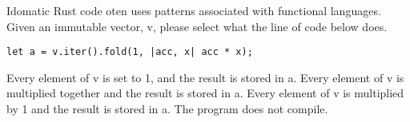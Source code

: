 %
%
Idomatic Rust code oten uses patterns associated with functional languages. Given an immutable vector, v, please select what the line of code below does.
\begin{lstlisting}
let a = v.iter().fold(1, |acc, x| acc * x);
\end{lstlisting}
  \choice Every element of v is set to 1, and the result is stored in a.
  \choice Every element of v is multiplied together and the result is stored in a.
  \choice Every element of v is multiplied by 1 and the result is stored in a.
  \choice The program does not compile.
